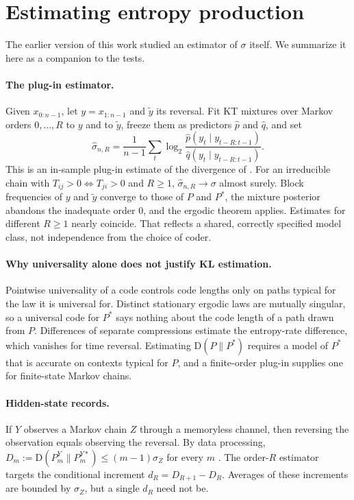 \documentclass[11pt]{article}
\theoremstyle{definition}
\theoremstyle{remark}
\newcommand{\KL}{\mathrm{D}}
\begin{document}
\appendix

\section{Estimating entropy production}\label{app:estimation}

The earlier version of this work studied an estimator of $\sigma$ itself. We summarize it here as a companion to the tests.

\paragraph{The plug-in estimator.} Given $x_{0:n-1}$, let $y=x_{1:n-1}$ and $\tilde y$ its reversal. Fit KT mixtures over Markov orders $0,\dots,R$ to $y$ and to $\tilde y$, freeze them as predictors $\hat p$ and $\hat q$, and set
\[
\hat\sigma_{n,R}=\frac1{n-1}\sum_t\log_2\frac{\hat p(y_t\mid y_{t-R:t-1})}{\hat q(y_t\mid y_{t-R:t-1})}.
\]
This is an in-sample plug-in estimate of the divergence of \cite{roldanparrondo2010,roldanparrondo2012}. For an irreducible chain with $T_{ij}>0\Leftrightarrow T_{ji}>0$ and $R\ge1$, $\hat\sigma_{n,R}\to\sigma$ almost surely. Block frequencies of $y$ and $\tilde y$ converge to those of $P$ and $P^\ast$, the mixture posterior abandons the inadequate order 0, and the ergodic theorem applies. Estimates for different $R\ge1$ nearly coincide. That reflects a shared, correctly specified model class, not independence from the choice of coder.

\paragraph{Why universality alone does not justify KL estimation.} Pointwise universality of a code controls code lengths only on paths typical for the law it is universal for. Distinct stationary ergodic laws are mutually singular, so a universal code for $P^\ast$ says nothing about the code length of a path drawn from $P$. Differences of separate compressions estimate the entropy-rate difference, which vanishes for time reversal. Estimating $\KL(P\|P^\ast)$ requires a model of $P^\ast$ that is accurate on contexts typical for $P$, and a finite-order plug-in supplies one for finite-state Markov chains.

\paragraph{Hidden-state records.} If $Y$ observes a Markov chain $Z$ through a memoryless channel, then reversing the observation equals observing the reversal. By data processing, $D_m:=\KL(P^Y_m\|P^{Y\ast}_m)\le(m-1)\sigma_Z$ for every $m$ \cite{gomezmarin2008}. The order-$R$ estimator targets the conditional increment $d_R=D_{R+1}-D_R$. Averages of these increments are bounded by $\sigma_Z$, but a single $d_R$ need not be.
\end{document}
